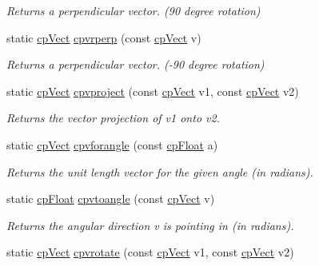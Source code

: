 \begin{DoxyCompactItemize}
\begin{DoxyCompactList}\small\item\em Returns a perpendicular vector. (90 degree rotation) \end{DoxyCompactList}\item 
\hypertarget{group__cp_vect_ga0be2829df5c1be940484fb64b7cab61e}{}static \hyperlink{structcp_vect}{cp\+Vect} \hyperlink{group__cp_vect_ga0be2829df5c1be940484fb64b7cab61e}{cpvrperp} (const \hyperlink{structcp_vect}{cp\+Vect} v)\label{group__cp_vect_ga0be2829df5c1be940484fb64b7cab61e}

\begin{DoxyCompactList}\small\item\em Returns a perpendicular vector. (-\/90 degree rotation) \end{DoxyCompactList}\item 
\hypertarget{group__cp_vect_gae9c42ec78caa7971459d10543b1549cd}{}static \hyperlink{structcp_vect}{cp\+Vect} \hyperlink{group__cp_vect_gae9c42ec78caa7971459d10543b1549cd}{cpvproject} (const \hyperlink{structcp_vect}{cp\+Vect} v1, const \hyperlink{structcp_vect}{cp\+Vect} v2)\label{group__cp_vect_gae9c42ec78caa7971459d10543b1549cd}

\begin{DoxyCompactList}\small\item\em Returns the vector projection of v1 onto v2. \end{DoxyCompactList}\item 
\hypertarget{group__cp_vect_gafa534ef07bb623104c576f63cbc6334a}{}static \hyperlink{structcp_vect}{cp\+Vect} \hyperlink{group__cp_vect_gafa534ef07bb623104c576f63cbc6334a}{cpvforangle} (const \hyperlink{group__basic_types_gac1ed65573e035bf892505768c852d8d3}{cp\+Float} a)\label{group__cp_vect_gafa534ef07bb623104c576f63cbc6334a}

\begin{DoxyCompactList}\small\item\em Returns the unit length vector for the given angle (in radians). \end{DoxyCompactList}\item 
\hypertarget{group__cp_vect_ga8ee2e1733c8ed09f2230a5788bd284e9}{}static \hyperlink{group__basic_types_gac1ed65573e035bf892505768c852d8d3}{cp\+Float} \hyperlink{group__cp_vect_ga8ee2e1733c8ed09f2230a5788bd284e9}{cpvtoangle} (const \hyperlink{structcp_vect}{cp\+Vect} v)\label{group__cp_vect_ga8ee2e1733c8ed09f2230a5788bd284e9}

\begin{DoxyCompactList}\small\item\em Returns the angular direction v is pointing in (in radians). \end{DoxyCompactList}\item 
\hypertarget{group__cp_vect_gac9a0bb9221f9f2068a48985fa70b5226}{}static \hyperlink{structcp_vect}{cp\+Vect} \hyperlink{group__cp_vect_gac9a0bb9221f9f2068a48985fa70b5226}{cpvrotate} (const \hyperlink{structcp_vect}{cp\+Vect} v1, const \hyperlink{structcp_vect}{cp\+Vect} v2)\label{group__cp_vect_gac9a0bb9221f9f2068a48985fa70b5226}


\end{DoxyCompactItemize}
